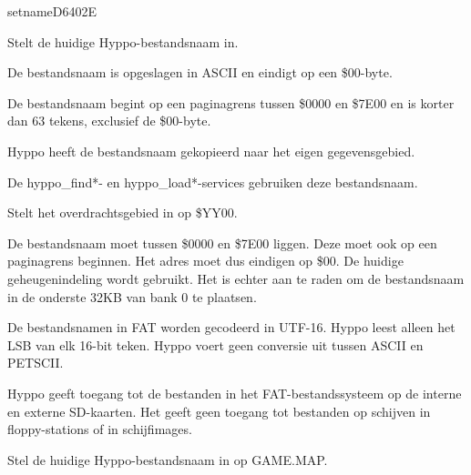 \newpage
\begin{hyppotrap}{setname}{D640}{2E}

\item [Dienst:]  Stelt de huidige Hyppo-bestandsnaam in.
\item [Voorbeding:]  De bestandsnaam is opgeslagen in ASCII en eindigt op een \$00-byte.

  De bestandsnaam begint op een paginagrens tussen \$0000 en \$7E00 en is korter  dan 63 tekens, exclusief de \$00-byte.
\item [Invoer:]  
\item [Nawerking:]  Hyppo heeft de bestandsnaam gekopieerd naar het eigen gegevensgebied.

  De hyppo\_find*- en hyppo\_load*-services gebruiken deze bestandsnaam.
\item [Neveneffect:]  Stelt het overdrachtsgebied in op \$YY00.
\item [Foutcodes:]    
\item [Geschiedenis:]
\item [Opmerkingen:]  De bestandsnaam moet tussen \$0000 en \$7E00 liggen. Deze moet ook op een paginagrens beginnen. Het adres moet dus eindigen op \$00. De huidige geheugenindeling wordt gebruikt. Het is echter aan te raden om de bestandsnaam in de onderste 32KB van bank 0 te plaatsen.

  De bestandsnamen in FAT worden gecodeerd in UTF-16. Hyppo leest alleen het LSB  van elk 16-bit teken. Hyppo voert geen conversie uit tussen ASCII en  PETSCII.

  Hyppo geeft toegang tot de bestanden in het FAT-bestandssysteem op de interne  en externe SD-kaarten. Het geeft geen toegang tot bestanden op schijven in floppy-stations of in  schijfimages.\item [Voorbeeld:]  Stel de huidige Hyppo-bestandsnaam in op GAME.MAP.
\end{hyppotrap}


